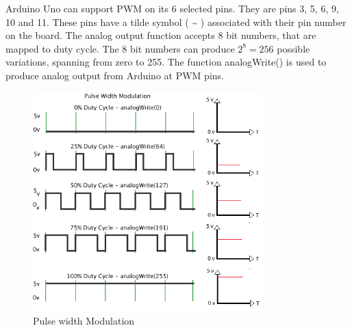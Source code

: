 \par Arduino Uno can support \ac{PWM} on its 6 selected pins. They are pins 3, 5, 6, 9, 10 and 11. These pins have a tilde symbol ( \textasciitilde{} ) associated with their pin number on the board. The analog output function accepts 8 bit numbers, that are mapped to duty cycle. The 8 bit numbers can produce $2^8=256$ possible variations, spanning from zero to 255. The function analogWrite() is used to  produce analog output from Arduino at \ac{PWM} pins.

\begin{figure}
 \centering 
 \includegraphics[width=3.5in]{Images/Intro_Arduino/pwm.png}
 \caption{Pulse width Modulation}
\end{figure}

\renewcommand{\arraystretch}{1.2}
\begin{table}
    \caption{ADC v/s PWM}
\end{table}
\renewcommand{\arraystretch}{1}

